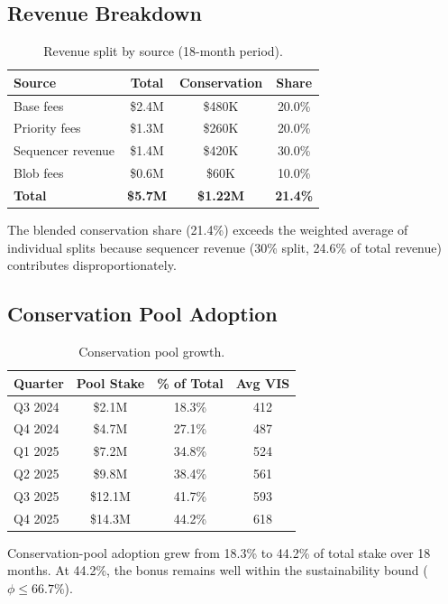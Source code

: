 \documentclass[11pt,letterpaper]{article}
\begin{document}
\subsection{Revenue Breakdown}

\begin{table}[t]
\centering
\begin{tabular}{lccc}
\toprule
\textbf{Source} & \textbf{Total} & \textbf{Conservation} & \textbf{Share} \\
\midrule
Base fees & \$2.4M & \$480K & 20.0\% \\
Priority fees & \$1.3M & \$260K & 20.0\% \\
Sequencer revenue & \$1.4M & \$420K & 30.0\% \\
Blob fees & \$0.6M & \$60K & 10.0\% \\
\midrule
\textbf{Total} & \textbf{\$5.7M} & \textbf{\$1.22M} & \textbf{21.4\%} \\
\bottomrule
\end{tabular}
\caption{Revenue split by source (18-month period).}
\label{tab:revenue}
\end{table}

The blended conservation share (21.4\%) exceeds the weighted average of individual splits because sequencer revenue (30\% split, 24.6\% of total revenue) contributes disproportionately.

\subsection{Conservation Pool Adoption}

\begin{table}[t]
\centering
\begin{tabular}{lccc}
\toprule
\textbf{Quarter} & \textbf{Pool Stake} & \textbf{\% of Total} & \textbf{Avg VIS} \\
\midrule
Q3 2024 & \$2.1M & 18.3\% & 412 \\
Q4 2024 & \$4.7M & 27.1\% & 487 \\
Q1 2025 & \$7.2M & 34.8\% & 524 \\
Q2 2025 & \$9.8M & 38.4\% & 561 \\
Q3 2025 & \$12.1M & 41.7\% & 593 \\
Q4 2025 & \$14.3M & 44.2\% & 618 \\
\bottomrule
\end{tabular}
\caption{Conservation pool growth.}
\label{tab:pool}
\end{table}

Conservation-pool adoption grew from 18.3\% to 44.2\% of total stake over 18 months. At 44.2\%, the bonus remains well within the sustainability bound ($\phi \leq 66.7\%$).
\end{document}
